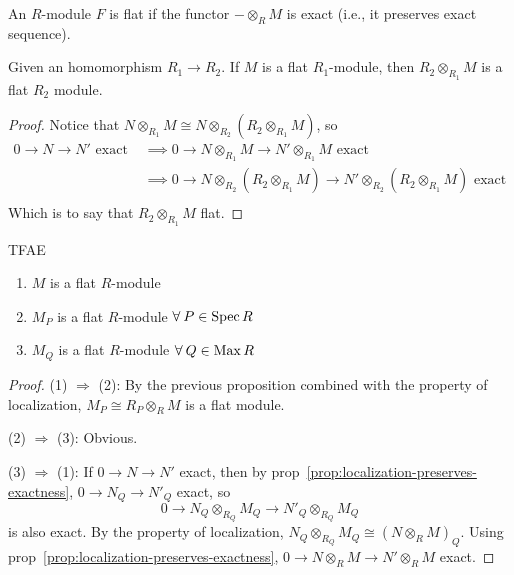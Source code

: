 \begin{definition}
  An $R$-module $F$ is  flat if the functor
  ${-} \otimes_R M$ is exact (i.e., it preserves exact sequence).
\end{definition}

\begin{prop}
  Given an homomorphism $R_1 \to R_2$.
  If $M$ is a flat $R_1$-module, then $R_2 \otimes_{R_1} M$ is a flat $R_2$ module.

  \begin{proof}
    Notice that $N \otimes_{R_1} M \cong N \otimes_{R_2} (R_2 \otimes_{R_1} M)$,
    so
    \begin{align*}
      0 \to N \to N' \text{ exact }
      &\implies 0 \to N \otimes_{R_1} M \to N' \otimes_{R_1} M \text{ exact } \\
      &\implies 0 \to N \otimes_{R_2} (R_2 \otimes_{R_1} M)
      \to N' \otimes_{R_2} (R_2 \otimes_{R_1} M) \text{ exact } \\
    \end{align*}
    Which is to say that $R_2 \otimes_{R_1} M$ flat.
  \end{proof}
\end{prop}

\begin{prop}
  TFAE
  \begin{enumerate}[(1)]
    \item $M$ is a flat $R$-module
    \item $M_P$ is a flat $R$-module $\forall P \in \Spec R$
    \item $M_Q$ is a flat $R$-module $\forall Q \in \Max R$
  \end{enumerate}

  \begin{proof}
    (1) $\Rightarrow$ (2): By the previous proposition combined with the property
    of localization, $M_P \cong R_P \otimes_R M$ is a flat module.

    (2) $\Rightarrow$ (3): Obvious.

    (3) $\Rightarrow$ (1):
    If $0 \to N \to N'$ exact, then by prop~\ref{prop:localization-preserves-exactness},
    $0 \to N_Q \to N'_Q$ exact, so
    \[ 0 \to N_Q \otimes_{R_Q} M_Q \to N'_Q \otimes_{R_Q} M_Q \]
    is also exact. By the property of localization, $N_Q \otimes_{R_Q} M_Q \cong (N \otimes_R M)_Q$.
    Using prop~\ref{prop:localization-preserves-exactness}, $0 \to N \otimes_R M \to N' \otimes_R M$ exact.
  \end{proof}
\end{prop}

